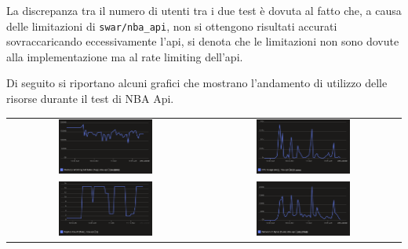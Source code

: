 La discrepanza tra il numero di utenti tra i due test è dovuta al fatto che, a causa delle limitazioni di \texttt{swar/nba\_api}, non si ottengono risultati accurati sovraccaricando eccessivamente l'api, si denota che le limitazioni non sono dovute alla implementazione ma al rate limiting dell'api.

Di seguito si riportano alcuni grafici che mostrano l'andamento di utilizzo delle risorse durante il test di NBA Api.


\begin{tabular}{ c c }
    \includegraphics[width=0.5\textwidth]{img/load_test/nba-api-mem-avg.png} & \includegraphics[width=0.5\textwidth]{img/load_test/nba-api-cpu-avg.png} \\
    \includegraphics[width=0.5\textwidth]{img/load_test/nba-api-rep-count.png} & \includegraphics[width=0.5\textwidth]{img/load_test/nba-api-rx-sum.png} \\
\end{tabular}


